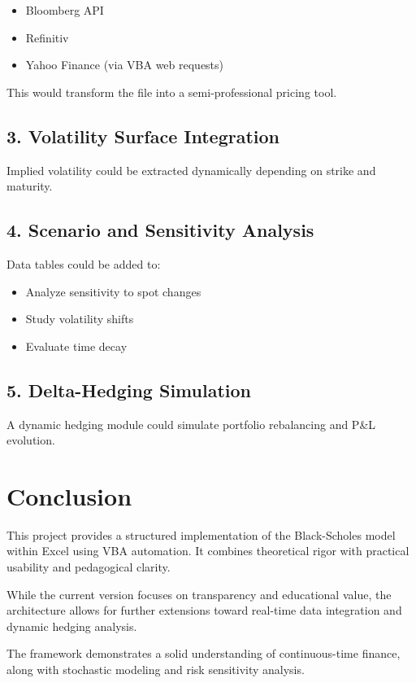 \documentclass[12pt]{article}
\begin{document}
\begin{itemize}
    \item Bloomberg API
    \item Refinitiv
    \item Yahoo Finance (via VBA web requests)
\end{itemize}

This would transform the file into a semi-professional pricing tool.

\subsection*{3. Volatility Surface Integration}

Implied volatility could be extracted dynamically depending on strike and maturity.

\subsection*{4. Scenario and Sensitivity Analysis}

Data tables could be added to:

\begin{itemize}
    \item Analyze sensitivity to spot changes
    \item Study volatility shifts
    \item Evaluate time decay
\end{itemize}

\subsection*{5. Delta-Hedging Simulation}

A dynamic hedging module could simulate portfolio rebalancing and P\&L evolution.

\section{Conclusion}

This project provides a structured implementation of the Black-Scholes model within Excel using VBA automation. It combines theoretical rigor with practical usability and pedagogical clarity.

While the current version focuses on transparency and educational value, the architecture allows for further extensions toward real-time data integration and dynamic hedging analysis.

The framework demonstrates a solid understanding of continuous-time finance, along with stochastic modeling and risk sensitivity analysis.
\end{document}
